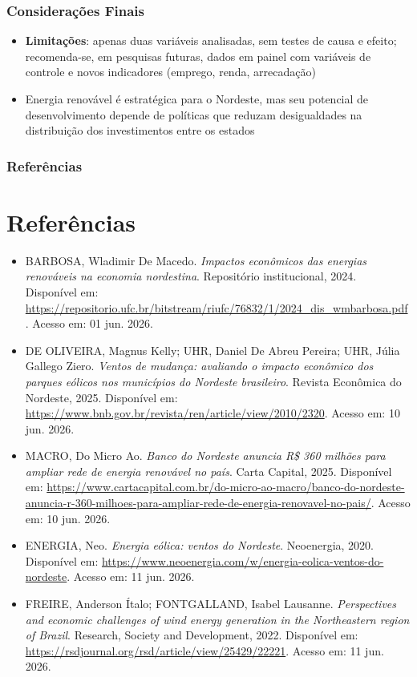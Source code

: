 \documentclass[11pt]{beamer}
\begin{document}
\begin{frame}
\frametitle{Considerações Finais}
\begin{itemize}
    \item \textbf{Limitações}: apenas duas variáveis analisadas, sem testes de causa e efeito; recomenda-se, em pesquisas futuras, dados em painel com variáveis de controle e novos indicadores (emprego, renda, arrecadação)
    \item Energia renovável é estratégica para o Nordeste, mas seu potencial de desenvolvimento depende de políticas que reduzam desigualdades na distribuição dos investimentos entre os estados
    \end{itemize}
\end{frame}
\begin{frame}[allowframebreaks,c]
\frametitle{Referências}
\section{Referências}
\footnotesize
\begin{itemize}
    \item BARBOSA, Wladimir De Macedo. \textit{Impactos econômicos das energias renováveis na economia nordestina}. Repositório institucional, 2024. Disponível em: \url{https://repositorio.ufc.br/bitstream/riufc/76832/1/2024_dis_wmbarbosa.pdf}. Acesso em: 01 jun. 2026.
    \item DE OLIVEIRA, Magnus Kelly; UHR, Daniel De Abreu Pereira; UHR, Júlia Gallego Ziero. \textit{Ventos de mudança: avaliando o impacto econômico dos parques eólicos nos municípios do Nordeste brasileiro}. Revista Econômica do Nordeste, 2025. Disponível em: \url{https://www.bnb.gov.br/revista/ren/article/view/2010/2320}. Acesso em: 10 jun. 2026.
    \item MACRO, Do Micro Ao. \textit{Banco do Nordeste anuncia R\$ 360 milhões para ampliar rede de energia renovável no país}. Carta Capital, 2025. Disponível em: \url{https://www.cartacapital.com.br/do-micro-ao-macro/banco-do-nordeste-anuncia-r-360-milhoes-para-ampliar-rede-de-energia-renovavel-no-pais/}. Acesso em: 10 jun. 2026.
    \item ENERGIA, Neo. \textit{Energia eólica: ventos do Nordeste}. Neoenergia, 2020. Disponível em: \url{https://www.neoenergia.com/w/energia-eolica-ventos-do-nordeste}. Acesso em: 11 jun. 2026.
    \item FREIRE, Anderson Ítalo; FONTGALLAND, Isabel Lausanne. \textit{Perspectives and economic challenges of wind energy generation in the Northeastern region of Brazil}. Research, Society and Development, 2022. Disponível em: \url{https://rsdjournal.org/rsd/article/view/25429/22221}. Acesso em: 11 jun. 2026.
\end{itemize}


\end{frame}
\end{document}
